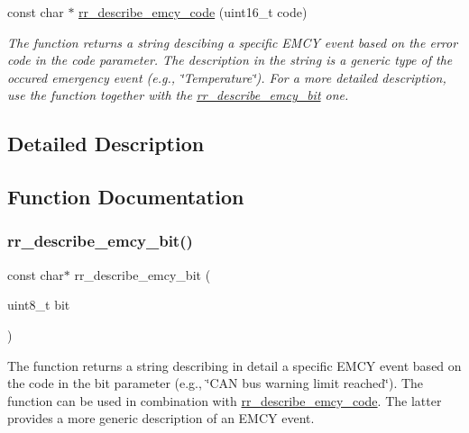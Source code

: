 \begin{DoxyCompactItemize}
const char $\ast$ \hyperlink{group___utils_ga2a5b7ff5f0e37ae3a856757cff7ced4f}{rr\+\_\+describe\+\_\+emcy\+\_\+code} (uint16\+\_\+t code)
\begin{DoxyCompactList}\small\item\em The function returns a string descibing a specific E\+M\+CY event based on the error code in the \textquotesingle{}code\textquotesingle{} parameter. The description in the string is a generic type of the occured emergency event (e.\+g., \char`\"{}\+Temperature\char`\"{}). For a more detailed description, use the function together with the \hyperlink{group___utils_gaa949cec80a64afa06ed9816fe1132888}{rr\+\_\+describe\+\_\+emcy\+\_\+bit} one. \end{DoxyCompactList}\end{DoxyCompactItemize}


\subsection{Detailed Description}


\subsection{Function Documentation}
\mbox{\label{group___utils_gaa949cec80a64afa06ed9816fe1132888}} 
\subsubsection{\texorpdfstring{rr\+\_\+describe\+\_\+emcy\+\_\+bit()}{rr\_describe\_emcy\_bit()}}
{\footnotesize\ttfamily const char$\ast$ rr\+\_\+describe\+\_\+emcy\+\_\+bit (\begin{DoxyParamCaption}\item[{uint8\+\_\+t}]{bit }\end{DoxyParamCaption})}



The function returns a string describing in detail a specific E\+M\+CY event based on the code in the \textquotesingle{}bit\textquotesingle{} parameter (e.\+g., \char`\"{}\+C\+A\+N bus warning limit reached\char`\"{}). The function can be used in combination with \hyperlink{group___utils_ga2a5b7ff5f0e37ae3a856757cff7ced4f}{rr\+\_\+describe\+\_\+emcy\+\_\+code}. The latter provides a more generic description of an E\+M\+CY event. 


